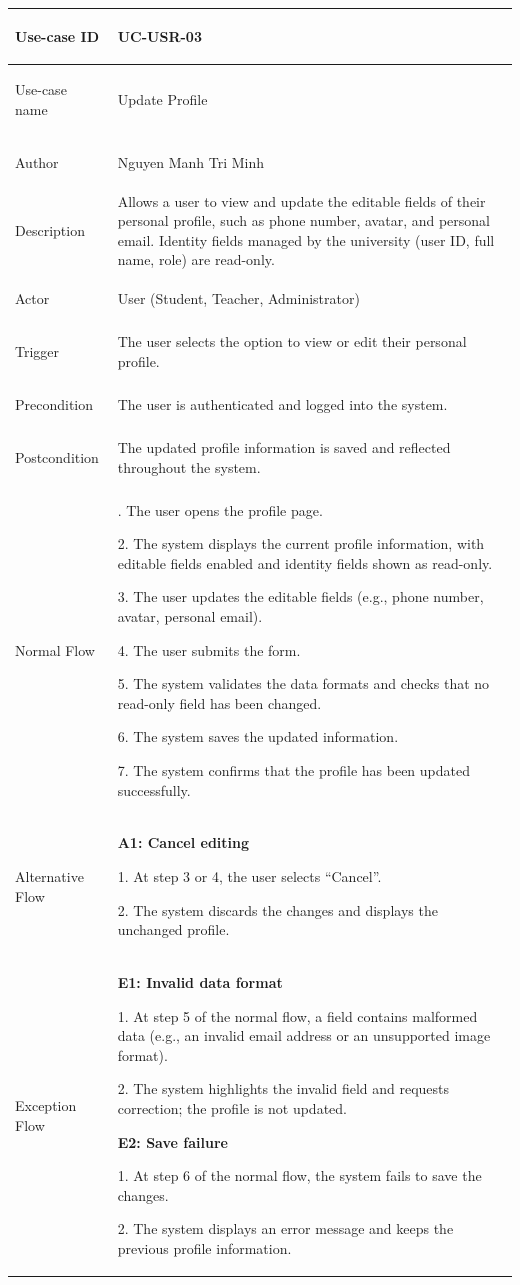 {
\renewcommand{\arraystretch}{1.1}
\setlength{\tabcolsep}{8pt}
\begin{longtable}{|>{\bfseries\raggedright\arraybackslash}p{}|>{\raggedright\arraybackslash}p{}|}
\hline
Use-case ID & UC-USR-03 \\ \hline
Use-case name & Update Profile \\ \hline
Author & Nguyen Manh Tri Minh \\ \hline
Description & Allows a user to view and update the editable fields of their personal profile, such as phone number, avatar, and personal email. Identity fields managed by the university (user ID, full name, role) are read-only. \\ \hline
Actor & User (Student, Teacher, Administrator) \\ \hline
Trigger & The user selects the option to view or edit their personal profile. \\ \hline
Precondition & The user is authenticated and logged into the system. \\ \hline
Postcondition & The updated profile information is saved and reflected throughout the system. \\ \hline
Normal Flow &
1. The user opens the profile page. \par
2. The system displays the current profile information, with editable fields enabled and identity fields shown as read-only. \par
3. The user updates the editable fields (e.g., phone number, avatar, personal email). \par
4. The user submits the form. \par
5. The system validates the data formats and checks that no read-only field has been changed. \par
6. The system saves the updated information. \par
7. The system confirms that the profile has been updated successfully. \\ \hline
Alternative Flow &
\textbf{A1: Cancel editing} \par
1. At step 3 or 4, the user selects ``Cancel''. \par
2. The system discards the changes and displays the unchanged profile. \\ \hline
Exception Flow &
\textbf{E1: Invalid data format} \par
1. At step 5 of the normal flow, a field contains malformed data (e.g., an invalid email address or an unsupported image format). \par
2. The system highlights the invalid field and requests correction; the profile is not updated. \par\vspace{4pt}
\textbf{E2: Save failure} \par
1. At step 6 of the normal flow, the system fails to save the changes. \par
2. The system displays an error message and keeps the previous profile information. \\ \hline
\end{longtable}
}


